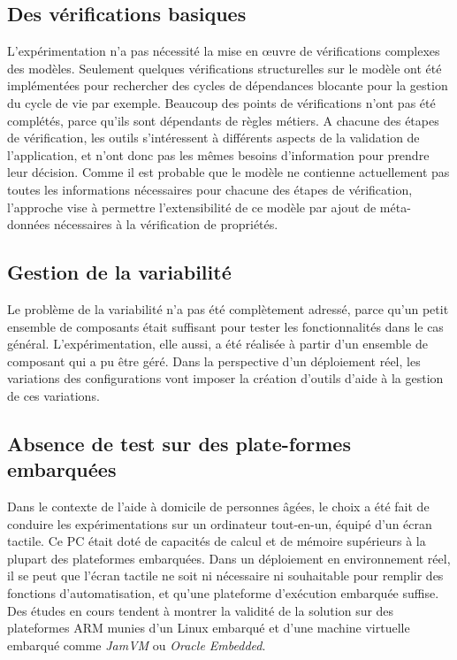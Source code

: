 \subsection{Des vérifications basiques}
L'expérimentation n'a pas nécessité la mise en \oe uvre de vérifications complexes des modèles. Seulement quelques vérifications structurelles sur le modèle ont été implémentées pour rechercher des cycles de dépendances blocante pour la gestion du cycle de vie par exemple. Beaucoup des points de vérifications n'ont pas été complétés, parce qu'ils sont dépendants de règles métiers. A chacune des étapes de vérification, les outils s'intéressent à différents aspects de la validation de l'application, et n'ont donc pas les mêmes besoins d'information pour prendre leur décision. Comme il est probable que le modèle ne contienne actuellement pas toutes les informations nécessaires pour chacune des étapes de vérification,  l'approche vise à permettre l'extensibilité de ce modèle par ajout de méta-données nécessaires à la vérification de propriétés. 


\subsection{Gestion de la variabilité}
Le problème de la variabilité n'a pas été complètement adressé, parce qu'un petit ensemble de composants était suffisant pour tester les fonctionnalités dans le cas général. L'expérimentation, elle aussi, a été réalisée à partir d'un ensemble de composant qui a pu être géré. Dans la perspective d'un déploiement réel, les variations des configurations vont imposer la création d'outils d'aide à la gestion de ces variations.

\subsection{Absence de test sur des plate-formes embarquées}

Dans le contexte de l'aide à domicile de personnes âgées, le choix a été fait de conduire les expérimentations sur un ordinateur tout-en-un, équipé d'un écran tactile. Ce PC était doté de capacités de calcul et de mémoire supérieurs à la plupart des plateformes embarquées. Dans un déploiement en environnement réel, il se peut que l'écran tactile ne soit ni nécessaire ni souhaitable pour remplir des fonctions d'automatisation, et qu'une plateforme d'exécution  embarquée suffise. Des études en cours tendent à montrer la validité de la solution sur des plateformes ARM munies d'un Linux embarqué et d'une machine virtuelle embarqué comme {\it JamVM} ou {\it Oracle Embedded}. 


